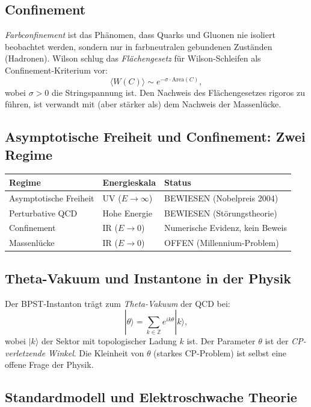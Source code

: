 \documentclass[12pt,a4paper]{amsart}
\theoremstyle{definition}
\theoremstyle{remark}
\begin{document}
\subsection{Confinement}

\emph{Farbconfinement} ist das Phänomen, dass Quarks und Gluonen nie isoliert beobachtet
werden, sondern nur in farbneutralen gebundenen Zuständen (Hadronen). Wilson \cite{Wilson1974}
schlug das \emph{Flächengesetz} für Wilson-Schleifen als Confinement-Kriterium vor:
\[
  \langle W(C) \rangle \sim e^{-\sigma \cdot \mathrm{Area}(C)},
\]
wobei $\sigma > 0$ die Stringspannung ist. Den Nachweis des Flächengesetzes rigoros zu
führen, ist verwandt mit (aber stärker als) dem Nachweis der Massenlücke.

\subsection{Asymptotische Freiheit und Confinement: Zwei Regime}

\begin{center}
\begin{tabular}{lll}
\toprule
\textbf{Regime} & \textbf{Energieskala} & \textbf{Status} \\
\midrule
Asymptotische Freiheit & UV ($E \to \infty$) & BEWIESEN (Nobelpreis 2004) \\
Perturbative QCD & Hohe Energie & BEWIESEN (Störungstheorie) \\
Confinement & IR ($E \to 0$) & Numerische Evidenz, kein Beweis \\
Massenlücke & IR ($E \to 0$) & OFFEN (Millennium-Problem) \\
\bottomrule
\end{tabular}
\end{center}

\subsection{Theta-Vakuum und Instantone in der Physik}

Der BPST-Instanton trägt zum \emph{Theta-Vakuum} der QCD bei:
\[
  |\theta\rangle = \sum_{k \in \mathbb{Z}} e^{i k \theta} |k\rangle,
\]
wobei $|k\rangle$ der Sektor mit topologischer Ladung $k$ ist. Der Parameter $\theta$
ist der \emph{CP-verletzende Winkel}. Die Kleinheit von $\theta$ (starkes CP-Problem)
ist selbst eine offene Frage der Physik.

\subsection{Standardmodell und Elektroschwache Theorie}
\end{document}
